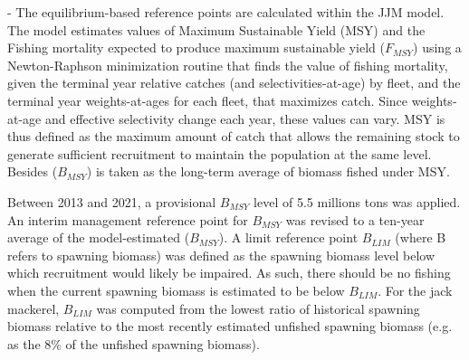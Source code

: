 \documentclass{article}
\begin{document}
- The equilibrium-based reference points are calculated within the JJM model. The model estimates values of Maximum Sustainable Yield (MSY) and the Fishing mortality expected to produce maximum sustainable yield (\(F_{MSY}\)) using a Newton-Raphson minimization routine that finds the value of fishing mortality, given the terminal year relative catches (and selectivities-at-age) by fleet,  and the terminal year weights-at-ages for each fleet, that maximizes catch. Since weights-at-age and effective selectivity change each year, these values can vary. MSY is thus defined as the maximum amount of catch that allows the remaining stock to generate sufficient recruitment to maintain the population at the same level. Besides (\(B_{MSY}\)) is taken as the long-term average of biomass fished under MSY.

Between 2013 and 2021, a provisional \(B_{MSY}\) level of 5.5 millions tons was applied. 
An interim management reference point for \(B_{MSY}\) was revised to a ten-year average of the model-estimated (\(B_{MSY}\)). 
A limit reference point \(B_{LIM}\) (where B refers to spawning biomass) was defined as the spawning biomass level below which recruitment would likely be impaired. As such, there should be no fishing when the current spawning biomass is estimated to be below \(B_{LIM}\).
For the jack mackerel, \(B_{LIM}\) was computed from the lowest ratio of historical spawning biomass relative to the most recently estimated unfished spawning biomass (e.g. as the 8\% of the unfished spawning biomass).\\

\end{document}
